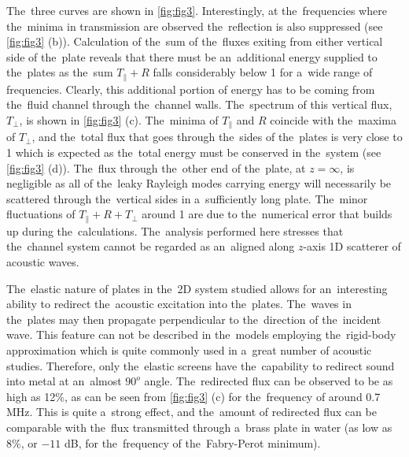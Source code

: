 The~three curves are shown in \cref{fig:fig3}.
Interestingly, at the~frequencies where the~minima in transmission are observed the~reflection is also suppressed (see \cref{fig:fig3} (b)).
Calculation of the~sum of the~fluxes exiting from either vertical side of the~plate reveals that there must be an~additional energy supplied to the~plates as the~sum $T_{\|}+R$ falls considerably below 1 for a~wide range of frequencies.
Clearly, this additional portion of energy has to be coming from the~fluid channel through the~channel walls.
The~spectrum of this vertical flux, $T_{\perp}$, is shown in \cref{fig:fig3} (c).
The~minima of $T_{\|}$ and $R$ coincide with the~maxima of $T_{\perp}$, and the~total flux that goes through the~sides of the~plates is very close to 1 which is expected as the~total energy must be conserved in the~system (see \cref{fig:fig3} (d)).
The~flux through the~other end of the~plate, at $z=\infty$, is negligible as all of the~leaky Rayleigh modes carrying energy will necessarily be scattered through the~vertical sides in a~sufficiently long plate.
The~minor fluctuations of $T_{\|}+R+T_{\perp}$ around 1 are due to the~numerical error that builds up during the~calculations.
The~analysis performed here stresses that the~channel system cannot be regarded as an~aligned along $z$-axis 1D scatterer of acoustic waves.

The~elastic nature of plates in the~2D system studied allows for an~interesting ability to redirect the~acoustic excitation into the~plates.
The~waves in the~plates may then propagate perpendicular to the~direction of the~incident wave.
This feature can not be described in the~models employing the~rigid-body approximation which is quite commonly used in a~great number of acoustic studies.
Therefore, only the~elastic screens have the~capability to redirect sound into metal at an~almost $90^o$ angle.
The~redirected flux can be observed to be as high as 12\%, as can be seen from \cref{fig:fig3} (c) for the~frequency of around 0.7 MHz.
This is quite a~strong effect, and the~amount of redirected flux can be comparable with the~flux transmitted through a~brass plate in water (as low as 8\%, or $-11$ dB, for the~frequency of the~Fabry-Perot minimum).


